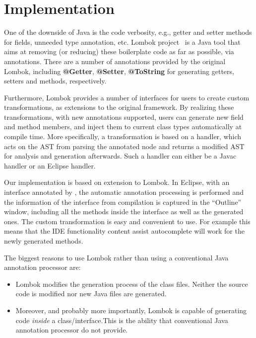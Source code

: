 \section{Implementation}

One of the downside of Java is the code verbosity, e.g., getter and setter
methods for fields, unneeded type annotation, etc. Lombok project~\cite{} is a
Java tool that aims at removing (or reducing) these boilerplate code as far as
possible, via annotations. There are a number of annotations provided by the
original Lombok, including \textbf{@Getter}, \textbf{@Setter},
\textbf{@ToString} for generating getters, setters and  methods,
respectively.

Furthermore, Lombok provides a number of interfaces for users to create custom
transformations, as extensions to the original framework. By realizing these
transformations, with new annotations supported, users can generate new field
and method members, and inject them to current class types automatically at
compile time. More specifically, a transformation is based on a handler, which
acts on the AST from parsing the annotated node and returns a modified AST for
analysis and generation afterwards. Such a handler can either be a Javac handler
or an Eclipse handler.

Our implementation is based on extension to Lombok. In Eclipse, with an
interface annotated by \mixin, the automatic annotation processing is performed
and the information of the interface from compilation is captured in the
``Outline'' window, including all the methods inside the interface as well as
the generated ones.
 The custom transformation is easy and convenient to use.
 For example this means that the IDE functionality 
 content assist autocomplete will work for the newly generated methods.

 The biggest reasons to use Lombok rather than using a conventional Java
 annotation processor are:
\begin{itemize}
\item Lombok modifies the generation process of the class files. Neither the
  source code is modified nor new Java files are generated.
\item Moreover, and probably more importantly, Lombok is capable of generating
  code \emph{inside} a class/interface.This is the ability that conventional
  Java annotation processor do not provide.
\end{itemize}

